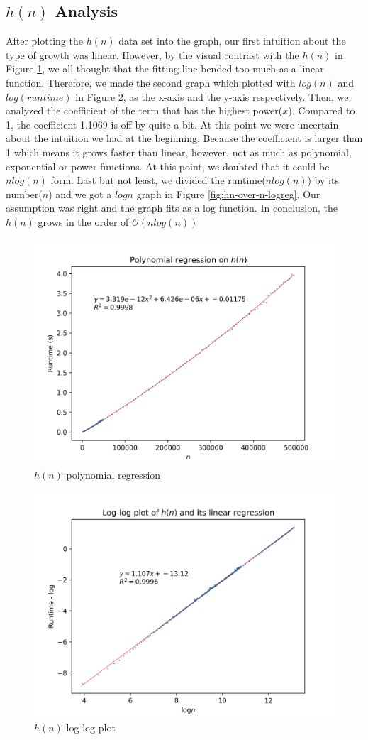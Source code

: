 \documentclass[titlepage, 12pt]{article}
\begin{document}
\subsection{$h(n)$ Analysis}
After plotting the $h(n)$ data set into the graph, our first intuition about the
type of growth was linear. However, by the visual contrast with the $h(n)$ in
Figure \ref{fig:hn-polyreg}, we all thought that the fitting line bended too
much as a linear function. Therefore, we made the second graph which plotted
with $log(n)$ and $log(runtime)$ in Figure \ref{fig:hn-log-linreg}, as the
x-axis and the y-axis respectively. Then, we analyzed the coefficient of the
term that has the highest power($x$). Compared to 1, the coefficient 1.1069 is
off by quite a bit. At this point we were uncertain about the intuition we had
at the beginning. Because the coefficient is larger than 1 which means it grows
faster than linear, however, not as much as polynomial, exponential or power
functions. At this point, we doubted that it could be $nlog(n)$ form. Last but
not least, we divided the runtime($nlog(n)$) by its number($n$) and we got a
$logn$ graph in Figure \ref{fig:hn-over-n-logreg}. Our assumption was right and
the graph fits as a log function. In conclusion, the $h(n)$ grows in the order
of $\mathcal{O}(nlog(n))$
\begin{figure}[H]
  \includegraphics[width=0.8\linewidth]{hn-polyreg.png}
  \centering
  \caption{$h(n)$ polynomial regression}
  \label{fig:hn-polyreg}
\end{figure}
\begin{figure}[H]
  \includegraphics[width=0.8\linewidth]{hn-log-linreg.png}
  \centering
  \caption{$h(n)$ log-log plot}
  \label{fig:hn-log-linreg}
\end{figure}
\end{document}
